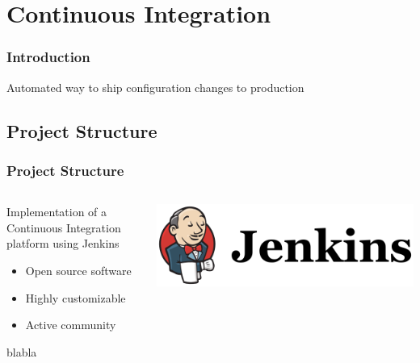 \documentclass[aspectratio=169]{beamer}
\begin{document}
\section{Continuous Integration}

\begin{frame}
    \frametitle{Introduction}

    Automated way to ship configuration changes to production
\end{frame}


\subsection{Project Structure}
\begin{frame}
    \frametitle{Project Structure}
    \begin{minipage}[t]{0.95\textwidth}
        \begin{columns}
            \begin{column}{0.5\textwidth}
            Implementation of a Continuous Integration platform using Jenkins
            \begin{itemize}
                \item Open source software
                \item Highly customizable
                \item Active community
            \end{itemize}
            blabla 
            \end{column}
            \begin{column}{0.5\textwidth}
                \vspace{-10px}
                \includegraphics[width=1.1\textwidth]{jenkins-logo.png}
            \end{column}
        \end{columns}
    \end{minipage}
\end{frame}
\end{document}
